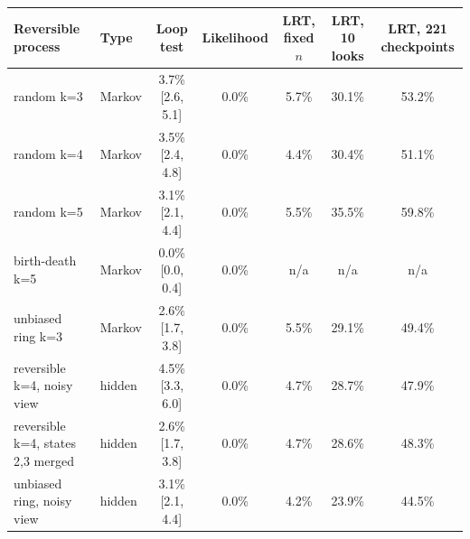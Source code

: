 \begin{tabular}{llccccc}
\toprule
Reversible process & Type & Loop test & Likelihood & LRT, fixed $n$ & LRT, 10 looks & LRT, 221 checkpoints \\
\midrule
random k=3 & Markov & 3.7\% [2.6, 5.1] & 0.0\% & 5.7\% & 30.1\% & 53.2\% \\
random k=4 & Markov & 3.5\% [2.4, 4.8] & 0.0\% & 4.4\% & 30.4\% & 51.1\% \\
random k=5 & Markov & 3.1\% [2.1, 4.4] & 0.0\% & 5.5\% & 35.5\% & 59.8\% \\
birth-death k=5 & Markov & 0.0\% [0.0, 0.4] & 0.0\% & n/a & n/a & n/a \\
unbiased ring k=3 & Markov & 2.6\% [1.7, 3.8] & 0.0\% & 5.5\% & 29.1\% & 49.4\% \\
reversible k=4, noisy view & hidden & 4.5\% [3.3, 6.0] & 0.0\% & 4.7\% & 28.7\% & 47.9\% \\
reversible k=4, states 2,3 merged & hidden & 2.6\% [1.7, 3.8] & 0.0\% & 4.7\% & 28.6\% & 48.3\% \\
unbiased ring, noisy view & hidden & 3.1\% [2.1, 4.4] & 0.0\% & 4.2\% & 23.9\% & 44.5\% \\
\bottomrule
\end{tabular}
